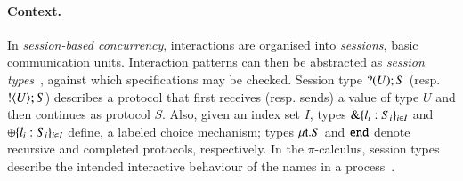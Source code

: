 \documentclass[runningheads]{llncs}
\begin{document}
\paragraph{Context.}
In \emph{session-based concurrency}, interactions are organised into \emph{sessions}, basic communication units.
Interaction patterns can then be abstracted as \emph{session types}~\cite{honda.vasconcelos.kubo:language-primitives}, against which  specifications may be checked. 
Session type $? (U) ; S$ (resp.  $! \langle U \rangle ; S$)
describes a protocol that first receives (resp. sends) a value of type $U$ and then continues as protocol $S$.
Also, given an index set $I$, types $\& \{l_i:S_i\}_{i \in I}$ 
and $\oplus \{l_i:S_i\}_{i \in I}$ 
define, %
 a labeled choice mechanism; types 
$\mu\mathsf{t}.S$ 
and 
$\mathtt{end}$ denote recursive and completed protocols, respectively.
In the %
$\pi$-calculus, %
session types describe the intended interactive behaviour of the names %
in a process~\cite{honda.vasconcelos.kubo:language-primitives}.
\end{document}
